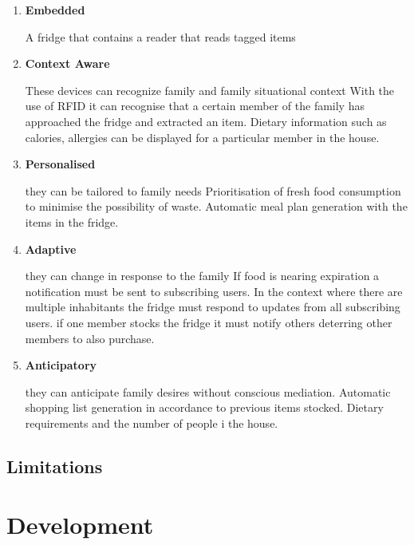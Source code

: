 \documentclass[a4paper, 11pt]{article}
\begin{document}
\begin{enumerate}
   \item \textbf{Embedded}
     \begin{flushleft}  A fridge that contains a reader that reads tagged items
   \end{flushleft}
   \item \textbf{Context Aware}
   \begin{flushleft} These devices can recognize family and family situational context
With the use of RFID it can recognise that a certain member of the family has approached the fridge and extracted an item. Dietary information such as calories, allergies can be displayed for a particular member in the house. 
  \end{flushleft}
   \item \textbf{Personalised}
   \begin{flushleft}they can be tailored to family needs
Prioritisation of fresh food consumption to minimise the possibility of waste. Automatic meal plan generation with the items in the fridge.
  \end{flushleft}
   \item \textbf{Adaptive}
   \begin{flushleft}they can change in response to the family
If food is nearing expiration a notification must be sent to subscribing users. 
In the context where there are multiple inhabitants the fridge must respond to updates from all subscribing users.  if one member stocks the fridge it must notify others deterring other members to also purchase.
  \end{flushleft}
   \item \textbf{Anticipatory}
   \begin{flushleft} they can anticipate family desires without conscious mediation.
Automatic shopping list generation in accordance to previous items stocked. Dietary requirements and the number of people i the house.  
 \end{flushleft}
\end{enumerate}

\subsection{Limitations}
\clearpage


\section{Development}
\end{document}
